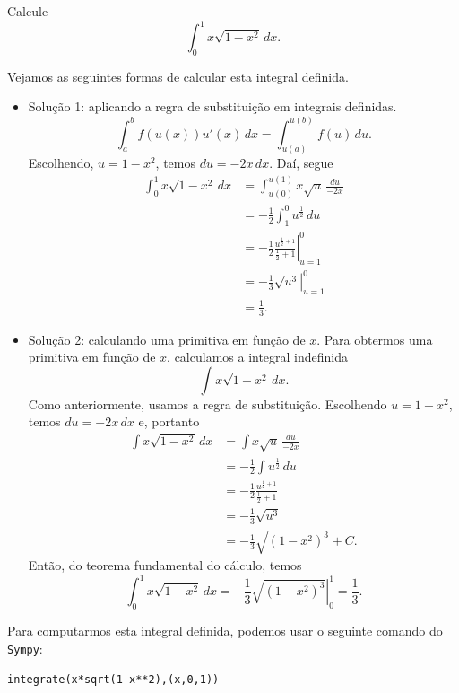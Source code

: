 \begin{exeresol}
  Calcule
  \begin{equation}
    \int_0^1x\sqrt{1-x^2}\,dx.
  \end{equation}
\end{exeresol}
\begin{resol}
  Vejamos as seguintes formas de calcular esta integral definida.
  \begin{itemize}
  \item Solução 1: aplicando a regra de substituição em integrais definidas.
    \begin{equation}
      \int_a^bf(u(x))u'(x)\,dx = \int_{u(a)}^{u(b)} f(u)\,du.
    \end{equation}
    Escolhendo, $u = 1-x^2$, temos $du = -2x\,dx$. Daí, segue
    \begin{align}
      \int_0^1x\sqrt{1-x^2}\,dx &= \int_{u(0)}^{u(1)}x\sqrt{u}\,\frac{du}{-2x}\\
                                &= -\frac{1}{2}\int_{1}^0 u^{\frac{1}{2}}\,du\\
                                &= -\frac{1}{2}\left.\frac{u^{\frac{1}{2}+1}}{\frac{1}{2}+1}\right|_{u=1}^0\\
                                &= -\frac{1}{3}\left.\sqrt{u^3}\right|_{u=1}^0\\
                                &= \frac{1}{3}.
    \end{align}
  \item Solução 2: calculando uma primitiva em função de $x$.
    Para obtermos uma primitiva em função de $x$, calculamos a integral indefinida
    \begin{equation}
      \int x\sqrt{1-x^2}\,dx.
    \end{equation}
    Como anteriormente, usamos a regra de substituição. Escolhendo $u=1-x^2$, temos $du = -2x\,dx$ e, portanto
    \begin{align}
      \int x\sqrt{1-x^2}\,dx &= \int x\sqrt{u}\,\frac{du}{-2x}\\
                             &= -\frac{1}{2}\int u^{\frac{1}{2}}\,du\\
                             &= -\frac{1}{2}\frac{u^{\frac{1}{2}+1}}{\frac{1}{2}+1}\\
                             &= -\frac{1}{3}\sqrt{u^3}\\
                             &= -\frac{1}{3}\sqrt{(1-x^2)^3} + C.
    \end{align}
    Então, do teorema fundamental do cálculo, temos
    \begin{equation}
      \int_0^1 x\sqrt{1-x^2}\,dx = -\frac{1}{3}\left.\sqrt{(1-x^2)^3}\right|_{0}^1 = \frac{1}{3}.
    \end{equation}
  \end{itemize}

  \ifispython
  Para computarmos esta integral definida, podemos usar o seguinte comando do \verb+Sympy+:
\begin{verbatim}
integrate(x*sqrt(1-x**2),(x,0,1))
\end{verbatim}
  \fi
\end{resol}

